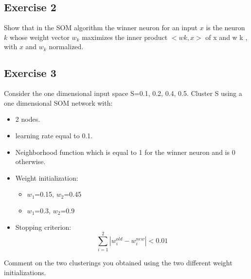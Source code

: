 \documentclass[a4paper, 12pt]{article}
\begin{document}
\subsection{Exercise 2}
Show that in the SOM algorithm the winner neuron for an input $x$ is the neuron $k$ whose weight vector $w_k$ maximizes the inner product $< w k ,x >$ of x and w k , with $x$ and $w_k$ normalized.

\subsection{Exercise 3}

Consider the one dimensional input space S={0.1, 0.2, 0.4, 0.5}.
Cluster S using a one dimensional SOM network with:

\begin{itemize}
\item 2 nodes.
\item learning rate equal to 0.1.
\item Neighborhood function which is equal to 1 for the winner neuron and is 0 otherwise.
\item Weight initialization:
\begin{itemize}
\item $w_1$=0.15, $w_2$=0.45
\item $w_1$=0.3, $w_2$=0.9
\end{itemize}
\item Stopping criterion: $$\sum_{i=1}^2|w_i^{old} - w_i^{new}| < 0.01$$
\end{itemize}

Comment on the two clusterings you obtained using the two different weight initializations.
\end{document}
